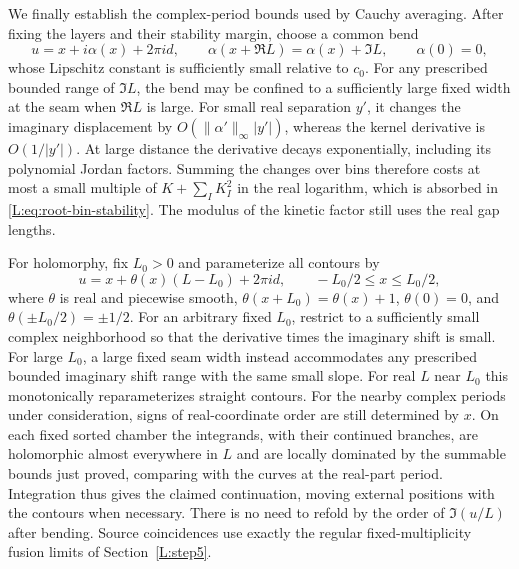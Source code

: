 We finally establish the complex-period bounds used by Cauchy averaging.
After fixing the layers and their stability margin, choose a common bend
\[
 u=x+i\alpha(x)+2\pi i d,\qquad
 \alpha(x+\Re L)=\alpha(x)+\Im L,\qquad\alpha(0)=0,
\]
whose Lipschitz constant is sufficiently small relative to $c_0$.
For any prescribed bounded range of $\Im L$, the bend may be confined
to a sufficiently large fixed width at the seam when $\Re L$ is large.
For small real separation $y'$, it changes the imaginary displacement
by $O(\|\alpha'\|_\infty|y'|)$, whereas the kernel derivative is
$O(1/|y'|)$. At large distance the derivative decays exponentially,
including its polynomial Jordan factors. Summing the changes over bins
therefore costs at most a small multiple of $K+\sum_IK_I^2$ in the real
logarithm, which is absorbed in \eqref{L:eq:root-bin-stability}.
The modulus of the kinetic factor still uses the real gap lengths.

For holomorphy, fix $L_0>0$ and parameterize all contours by
\[
 u=x+\theta(x)(L-L_0)+2\pi i d,
 \qquad -L_0/2\le x\le L_0/2,
\]
where $\theta$ is real and piecewise smooth,
$\theta(x+L_0)=\theta(x)+1$, $\theta(0)=0$, and
$\theta(\pm L_0/2)=\pm1/2$. For an arbitrary fixed $L_0$, restrict to a sufficiently small complex
neighborhood so that the derivative times the imaginary shift is small.
For large $L_0$, a large fixed seam width instead accommodates any
prescribed bounded imaginary shift range with the same small slope.
For real $L$ near $L_0$ this monotonically reparameterizes straight
contours. For the nearby complex periods under consideration, signs of
real-coordinate order are still determined by $x$. On each fixed sorted
chamber the integrands, with their continued branches, are holomorphic
almost everywhere in $L$ and are locally dominated by the summable
bounds just proved, comparing with the curves at the real-part period.
Integration thus gives the claimed continuation, moving external
positions with the contours when necessary. There is no need to refold
by the order of $\Im(u/L)$ after bending. Source coincidences use exactly
the regular fixed-multiplicity fusion limits of Section~\ref{L:step5}.
